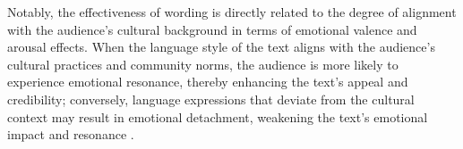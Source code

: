 Notably, the effectiveness of wording is directly related to the degree of alignment with the audience's cultural background in terms of emotional valence and arousal effects. When the language style of the text aligns with the audience's cultural practices and community norms, the audience is more likely to experience emotional resonance, thereby enhancing the text's appeal and credibility; conversely, language expressions that deviate from the cultural context may result in emotional detachment, weakening the text's emotional impact and resonance \cite{ludwig2013more}.


